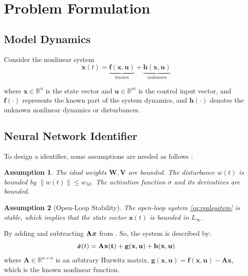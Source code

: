 \documentclass[10pt,twocolumn]{ICCAS}
\newcommand{\R}{\mathbb{R}}
\newtheorem{assumption}{Assumption}
\begin{document}
\section{Problem Formulation}
\subsection{Model Dynamics}

Consider the nonlinear system
\begin{equation}
    \dot{\bm{x}}(t) = \underbrace{\bm{f}(\bm{x}, \bm{u})}_{known} + \underbrace{\bm{h}(\bm{x}, \bm{u})}_{unknown}
    \label{eq:realsystem}
\end{equation}

where $\bm{x} \in \mathbb{R}^n$ is the state vector and $\bm{u} \in \mathbb{R}^m$ is the control input vector, and $\bm{f}(\cdot)$ represents the known part of the system dynamics, and $\bm{h}(\cdot)$ denotes the unknown nonlinear dynamics or disturbances.
\subsection{Neural Network Identifier}
To design a identifier, some assumptions are needed as follows : 
\begin{assumption}
The ideal weights $\mathbf{W}, \mathbf{V}$ are bounded. The disturbance $w(t)$ is bounded by $\|w(t)\| \le w_M$. The activation function $\sigma$ and its derivatives are bounded.\\
\end{assumption}

\begin{assumption}[Open-Loop Stability]
The open-loop system \eqref{eq:realsystem} is stable, which implies that the state vector $\bm{x}(t)$ is bounded in $L_\infty$.\\ 
\end{assumption}
By adding and subtracting ${\bf{A}}\bm{x}$ from . So, the system is described by:
\begin{equation}
    \dot{\bm{x}}(t) = \bf{A}\bm{x}(t) + \bm{g}(\bm{x}, \bm{u}) + \bm{h}(\bm{x}, \bm{u})
    \label{eq:system}
\end{equation}
where $\mathbf{A} \in \R^{n \times n}$ is an arbitrary Hurwitz matrix, $\bm{g}(\bm{x},\bm{u}) = \bm{f}(\bm{x}, \bm{u}) - {\mathbf{A}} \bm{x} $, which is the known nonlinear function.
\end{document}
